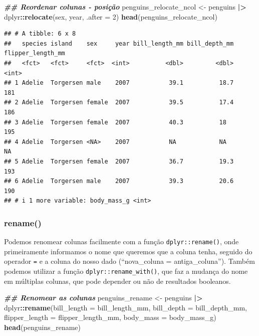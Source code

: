 \documentclass[
]{article}
\newenvironment{Shaded}{\begin{snugshade}}{\end{snugshade}}
\newcommand{\AttributeTok}[1]{\textcolor[rgb]{0.13,0.29,0.53}{#1}}
\newcommand{\DecValTok}[1]{\textcolor[rgb]{0.00,0.00,0.81}{#1}}
\newcommand{\DocumentationTok}[1]{\textcolor[rgb]{0.56,0.35,0.01}{\textbf{\textit{#1}}}}
\newcommand{\FunctionTok}[1]{\textcolor[rgb]{0.13,0.29,0.53}{\textbf{#1}}}
\newcommand{\NormalTok}[1]{#1}
\newcommand{\OtherTok}[1]{\textcolor[rgb]{0.56,0.35,0.01}{#1}}
\newcommand{\SpecialCharTok}[1]{\textcolor[rgb]{0.81,0.36,0.00}{\textbf{#1}}}
\begin{document}
\begin{Shaded}
\begin{Highlighting}[]
\DocumentationTok{\#\# Reordenar colunas {-} posição}
\NormalTok{penguins\_relocate\_ncol }\OtherTok{\textless{}{-}}\NormalTok{ penguins }\SpecialCharTok{|\textgreater{}} 
\NormalTok{    dplyr}\SpecialCharTok{::}\FunctionTok{relocate}\NormalTok{(sex, year, }\AttributeTok{.after =} \DecValTok{2}\NormalTok{)}
\FunctionTok{head}\NormalTok{(penguins\_relocate\_ncol)}
\end{Highlighting}
\end{Shaded}

\begin{verbatim}
## # A tibble: 6 x 8
##   species island    sex     year bill_length_mm bill_depth_mm flipper_length_mm
##   <fct>   <fct>     <fct>  <int>          <dbl>         <dbl>             <int>
## 1 Adelie  Torgersen male    2007           39.1          18.7               181
## 2 Adelie  Torgersen female  2007           39.5          17.4               186
## 3 Adelie  Torgersen female  2007           40.3          18                 195
## 4 Adelie  Torgersen <NA>    2007           NA            NA                  NA
## 5 Adelie  Torgersen female  2007           36.7          19.3               193
## 6 Adelie  Torgersen male    2007           39.3          20.6               190
## # i 1 more variable: body_mass_g <int>
\end{verbatim}

\hypertarget{rename}{%
\subsubsection{rename()}\label{rename}}

Podemos renomear colunas facilmente com a função \texttt{dplyr::rename()}, onde primeiramente informamos o nome que queremos que a coluna tenha, seguido do operador \texttt{=} e a coluna do nosso dado (``nova\_coluna = antiga\_coluna''). Também podemos utilizar a função \texttt{dplyr::rename\_with()}, que faz a mudança do nome em múltiplas colunas, que pode depender ou não de resultados booleanos.

\begin{Shaded}
\begin{Highlighting}[]
\DocumentationTok{\#\# Renomear as colunas}
\NormalTok{penguins\_rename }\OtherTok{\textless{}{-}}\NormalTok{ penguins }\SpecialCharTok{|\textgreater{}} 
\NormalTok{    dplyr}\SpecialCharTok{::}\FunctionTok{rename}\NormalTok{(}\AttributeTok{bill\_length =}\NormalTok{ bill\_length\_mm,}
                  \AttributeTok{bill\_depth =}\NormalTok{ bill\_depth\_mm,}
                  \AttributeTok{flipper\_length =}\NormalTok{ flipper\_length\_mm,}
                  \AttributeTok{body\_mass =}\NormalTok{ body\_mass\_g)}
\FunctionTok{head}\NormalTok{(penguins\_rename)}
\end{Highlighting}
\end{Shaded}
\end{document}
